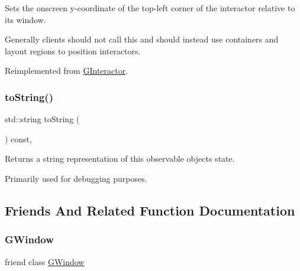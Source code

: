 Sets the onscreen y-\/coordinate of the top-\/left corner of the interactor relative to its window. 

Generally clients should not call this and should instead use containers and layout regions to position interactors. 

Reimplemented from \mbox{\hyperlink{classsgl_1_1GInteractor_a7d57e2a5c35d27feb58fd498a3cf82b9}{G\+Interactor}}.

\mbox{\label{classsgl_1_1GObservable_a1fe5121d6528fdea3f243321b3fa3a49}} 
\subsubsection{\texorpdfstring{to\+String()}{toString()}}
{\footnotesize\ttfamily std\+::string to\+String (\begin{DoxyParamCaption}{ }\end{DoxyParamCaption}) const\hspace{0.3cm}{\ttfamily [virtual]}, {\ttfamily [inherited]}}



Returns a string representation of this observable object\textquotesingle{}s state. 

Primarily used for debugging purposes. 

\subsection{Friends And Related Function Documentation}
\mbox{\label{classsgl_1_1GLabel_a20230fe9431fcdad4afa6bfec61b5833}} 
\subsubsection{\texorpdfstring{G\+Window}{GWindow}}
{\footnotesize\ttfamily friend class \mbox{\hyperlink{classsgl_1_1GWindow}{G\+Window}}\hspace{0.3cm}{\ttfamily [friend]}}

